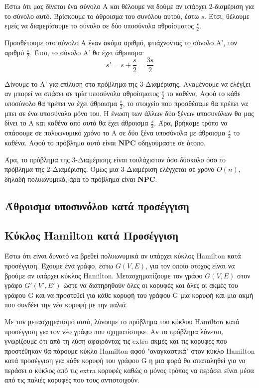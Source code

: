 \documentclass[a4paper,oneside, 11pt]{article}
\begin{document}
Έστω ότι μας δίνεται ένα σύνολο A και θέλουμε να δούμε αν υπάρχει 2-διαμέριση για το σύνολο αυτό. Βρίσκουμε το άθροισμα του συνόλου αυτού, έστω $s$. Έτσι, θέλουμε εμείς να διαμερίσουμε το σύνολο σε δύο υποσύνολα αθροίσματος $\frac{s}{2}$. \bigbreak 

Προσθέτουμε στο σύνολο Α έναν ακόμα αριθμό, φτιάχνοντας το σύνολο Α', τον αριθμό $\frac{s}{2}$. Έτσι, το σύνολο Α' θα έχει άθροισμα:
$$
s' = s + \frac{s}{2} = \frac{3s}{2}
$$ 

Δίνουμε το Α' για επίλυση στο πρόβλημα της 3-Διαμέρισης. Αναμένουμε να ελέγξει αν μπορεί να σπάσει σε τρία υποσύνολα αθροίσματος $\frac{s}{2}$ το καθένα. Αφού το κάθε υποσύνολο θα πρέπει να έχει άθροισμα $\frac{s}{2}$, το στοιχείο που προσθέσαμε θα πρέπει να μπει σε ένα υποσύνολο μόνο του. Η ένωση των άλλων δύο ξένων υποσυνόλων θα μας δίνει το Α και καθένα από αυτά θα έχει άθροισμα $\frac{s}{2}$. Άρα, βρήκαμε τρόπο να σπάσουμε σε πολυωνυμικό χρόνο το Α σε δύο ξένα υποσύνολα με άθροισμα $\frac{s}{2}$ το καθένα. Αφού το πρόβλημα αυτό είναι \textbf{NPC} οδηγούμαστε σε άτοπο. \bigbreak 

Άρα, το πρόβλημα της 3-Διαμέρισης είναι τουλάχιστον όσο δύσκολο όσο το πρόβλημα της 2-Διαμέρισης. Όμως μια 3-Διαμέριση ελέγχεται σε χρόνο $O(n)$, δηλαδή πολυωνυμικό, άρα το πρόβλημα είναι \textbf{NPC}.



\subsection{Άθροισμα υποσυνόλου κατά προσέγγιση}
\subsection{Κύκλος Hamilton κατά Προσέγγιση}
Έστω ότι είναι δυνατό να βρεθεί πολυωνυμικά αν υπάρχει κύκλος Hamilton κατά προσέγγιση. Έχουμε ένα γράφο, έστω $G(V,E)$, για τον οποίο στόχος είναι να βρούμε αν υπάρχει κύκλος Hamilton. Μετασχηματίζουμε τον γράφο $G(V,E)$ στον γράφο $G'(V', E')$ ώστε να διατηρηθούν όλες οι κορυφές και όλες οι ακμές του γράφου G και να προστεθεί για κάθε κορυφή του γράφου G μια κορυφή και μια ακμή που συνδέει την νέα κορυφή με την παλιά. \bigbreak

Με τον μετασχηματισμό αυτό, λύνουμε το πρόβλημα του κύκλου Hamilton κατά προσέγγιση για τον νέο γράφο που σχηματίστηκε. Αν το πρόβλημα λύνεται, γνωρίζουμε ότι από τη λύση αφαιρόντας τις extra ακμές και τις κορυφές που προστέθηκαν θα πάρουμε κύκλο Hamilton αφού "αναγκαστικά" στον κύκλο Hamilton κατά προσέγγιση για κάθε κορυφή του γράφου G η μια φορά θα σπαταληθεί για να περάσει ο κύκλος από τις extra κορυφές καθώς ο μόνος τρόπος να περάσει είναι μέσα από τις παλιές κορυφές που τους αντιστοιχούν. \bigbreak 
\end{document}
